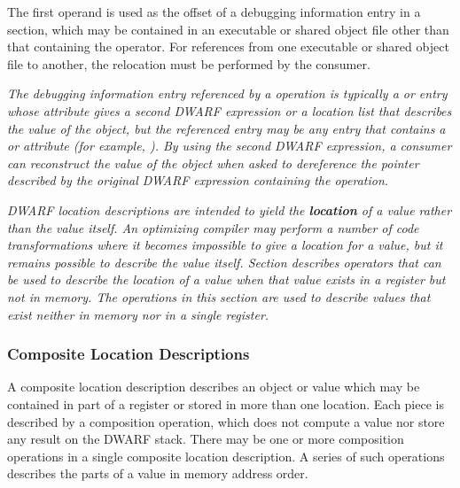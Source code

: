 \begin{enumerate}[1. ]
The first operand is used as the offset of a debugging
information entry in a \dotdebuginfo{} section, which may be
contained in an executable or shared object file other than that
containing the operator. For references from one executable or
shared object file to another, the relocation must be performed 
by the consumer.

\textit{The debugging information entry referenced by a 
\DWOPimplicitpointerNAME{} operation is typically a
\DWTAGvariable{} or \DWTAGformalparameter{} entry whose
\DWATlocation{} attribute gives a second DWARF expression or a
location list that describes the value of the object, but the
referenced entry may be any entry that contains a \DWATlocation{}
or \DWATconstvalue{} attribute (for example, \DWTAGdwarfprocedure).
By using the second DWARF expression, a consumer can
reconstruct the value of the object when asked to dereference
the pointer described by the original DWARF expression
containing the \DWOPimplicitpointer{} operation.}

\end{enumerate}

\textit{DWARF location descriptions 
are intended to yield the \textbf{location}
of a value rather than the value itself. An optimizing compiler
may perform a number of code transformations where it becomes
impossible to give a location for a value, but it remains possible
to describe the value itself. 
Section 
describes operators that can be used to
describe the location of a value when that value exists in a
register but not in memory. The operations in this section are
used to describe values that exist neither in memory nor in a
single register.}
 

\subsubsection{Composite Location Descriptions}
A composite location description describes an object or
value which may be contained in part of a register or stored
in more than one location. Each piece is described by a
composition operation, which does not compute a value nor
store any result on the DWARF stack. There may be one or
more composition operations in a single composite location
description. A series of such operations describes the parts
of a value in memory address order.

